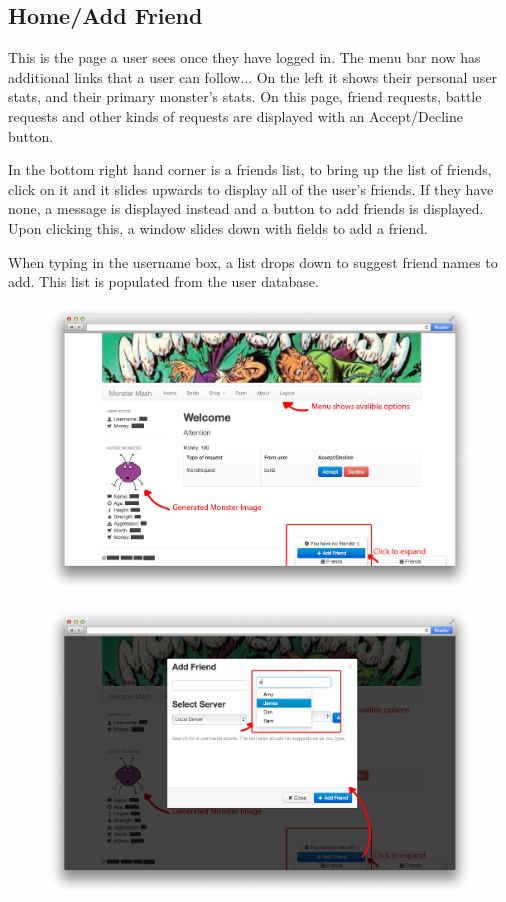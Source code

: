 \subsection{Home/Add Friend}
This is the page a user sees once they have logged in. The menu bar now has additional links that a user can follow... On the left it shows their personal user stats, and their primary monster's stats. On this page, friend requests, battle requests and other kinds of requests are displayed with an Accept/Decline button.

In the bottom right hand corner is a friends list, to bring up the list of friends, click on it and it slides upwards to display all of the user's friends. If they have none, a message is displayed instead and a button to add friends is displayed. Upon clicking this, a window slides down with fields to add a friend.

When typing in the username box, a list drops down to suggest friend names to add. This list is populated from the user database.
\begin{figure}[h]
\centering
\includegraphics[width=1.00\textwidth]{home.png}
\label{fig:home}
\end{figure}
\begin{figure}[h]
\centering
\includegraphics[width=1.00\textwidth]{home_addfriend.png}
\label{fig:home_addfriend}
\end{figure}

